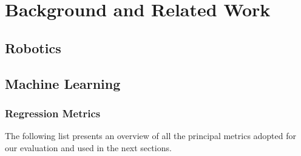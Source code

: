 \chapter{Background and Related Work}
\label{chap:theory}




\section{Robotics}
\label{sec:robotics}

%




\section{Machine Learning}
\label{sec:machine-learning}


\subsection{Regression Metrics}
\label{subsec:metrics}

The following list presents an overview of all the principal metrics adopted for our evaluation and used in the next sections.

